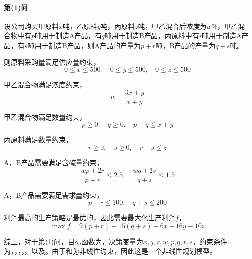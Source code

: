 \documentclass[12pt,a4paper]{article}
\begin{document}
\paragraph{第(1)问} 设公司购买甲原料$x$吨，乙原料$y$吨，丙原料$z$吨，甲乙混合后浓度为$w$\%，甲乙混合物中有$p$吨用于制造A产品，有$q$吨用于制造B产品，丙原料中有$r$吨用于制造A产品，有$s$吨用于制造B产品，则A产品的产量为$p+r$吨，B产品的产量为$q+s$吨。

则原料采购量满足供应量约束，
\begin{equation}\label{eq:ex4_cons_supply}
    0 \le x \le 500, \quad 0 \le y \le 500, \quad 0 \le z \le 500
\end{equation}

甲乙混合物满足浓度约束，
\begin{equation}\label{eq:ex4_cons_concent}
    w = \frac{3x+y}{x+y}
\end{equation}

甲乙混合物满足数量约束，
\begin{equation}\label{eq:ex4_cons_mixed}
    p \ge 0, \quad q \ge 0, \quad p + q \le x + y
\end{equation}

丙原料满足数量约束，
\begin{equation}\label{eq:ex4_cons_z}
    r \ge 0, \quad s \ge 0, \quad r + s \le z
\end{equation}

A，B产品需要满足含硫量约束，
\begin{equation}\label{eq:ex4_cons_sulphur}
    \frac{wp + 2r}{p + r} \le 2.5, \quad \frac{wq + 2s}{q + s} \le 1.5
\end{equation}

A，B产品需要满足需求量约束，
\begin{equation}\label{eq:ex4_cons_demand}
    p + r \le 100, \quad q + s \le 200
\end{equation}

利润最高的生产策略是最优的，因此需要最大化生产利润$f$，
\begin{equation}\label{eq:ex4_target}
    \max f = 9(p+r) + 15(q+s) - 6x - 16y - 10z
\end{equation}

综上，对于第(1)问，目标函数为，决策变量为$x,y,z,w,p,q,r,s$，约束条件为，，，，，以及。由于和为非线性约束，因此这是一个非线性规划模型。
\end{document}

